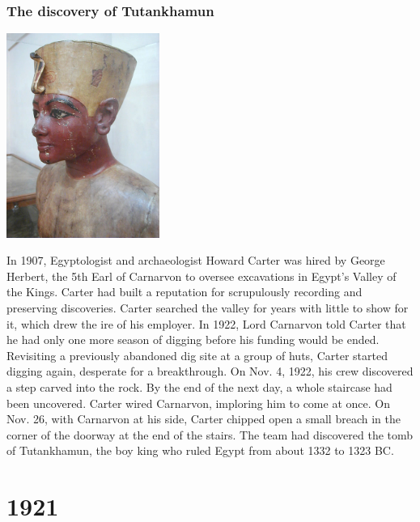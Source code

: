\documentclass[11pt]{report}
\begin{document}
\subsection{The discovery of Tutankhamun}
\vspace{2mm}\begin{center}\includegraphics[width=5cm]{./img/tutankhamon.jpg}\end{center}
In 1907, Egyptologist and archaeologist Howard Carter was hired by George Herbert, the 5th Earl of Carnarvon to oversee excavations in Egypt’s Valley of the Kings. Carter had built a reputation for scrupulously recording and preserving discoveries.
Carter searched the valley for years with little to show for it, which drew the ire of his employer. In 1922, Lord Carnarvon told Carter that he had only one more season of digging before his funding would be ended.\\
\indent Revisiting a previously abandoned dig site at a group of huts, Carter started digging again, desperate for a breakthrough.
On Nov. 4, 1922, his crew discovered a step carved into the rock. By the end of the next day, a whole staircase had been uncovered. Carter wired Carnarvon, imploring him to come at once.
On Nov. 26, with Carnarvon at his side, Carter chipped open a small breach in the corner of the doorway at the end of the stairs.
The team had discovered the tomb of Tutankhamun, the boy king who ruled Egypt from about 1332 to 1323 BC.

\chapter{1921}
\section{}
\end{document}

